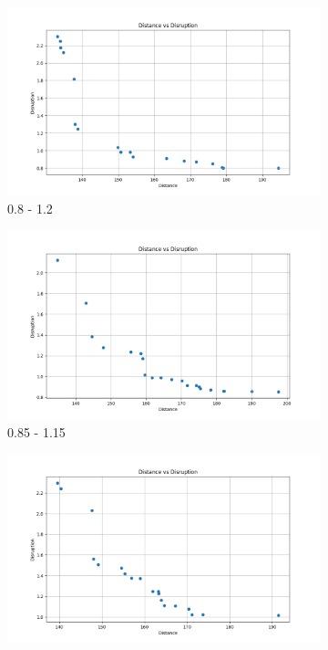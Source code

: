 \documentclass[12pt,a4paper]{article}
\begin{document}
\begin{figure}[H]
    \centering
    \begin{subfigure}{0.32\textwidth}
        \centering
        \includegraphics[width=\textwidth]{figures/solve3-0.8.png}
        \caption{0.8 - 1.2}
        \label{fig:solve1}
    \end{subfigure}
    \hfill
    \begin{subfigure}{0.32\textwidth}
        \centering
        \includegraphics[width=\textwidth]{figures/solve3-0.85.png}
        \caption{0.85 - 1.15}
        \label{fig:solve2}
    \end{subfigure}
    \hfill
    \begin{subfigure}{0.32\textwidth}
        \centering
        \includegraphics[width=\textwidth]{figures/solve3-0.9.png}

\end{subfigure}
\end{figure}
\end{document}
